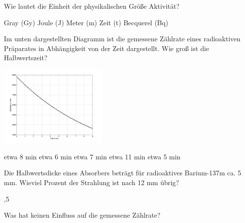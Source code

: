 \documentclass[11pt]{exam}
\begin{document}
\setlength{\voffset}{-0.5in}
\setlength{\headsep}{5pt}

\hspace{2mm}
 \hspace{5mm}
\vspace{4mm}

\begin{questions}

\question Wie lautet die Einheit der physikalischen Größe Aktivität?

\begin{choices}
	\choice Gray (Gy)
	\choice Joule (J)
	\choice Meter (m)
	\choice Zeit (t)
	\choice Becquerel (Bq)
\end{choices}

\vspace{3mm}\question Im unten dargestellten Diagramm ist die gemessene Zählrate eines radioaktiven Präparates in Abhängigkeit von der Zeit dargestellt. Wie groß ist die Halbwertszeit?

\includegraphics[width=0.4\textwidth]{images/zerfall2.png}

\begin{choices}
	\choice etwa 8 min
	\choice etwa 6 min
	\choice etwa 7 min
	\choice etwa 11 min
	\choice etwa 5 min
\end{choices}

\vspace{3mm}\question Die Halbwertsdicke eines Absorbers beträgt für radioaktives Barium-137m ca. 5 mm. Wieviel Prozent der Strahlung ist nach 12 mm übrig?

\begin{choices}
	,5 %
\end{choices}

\vspace{3mm}\question Was hat keinen Einfluss auf die gemessene Zählrate?


\end{questions}
\end{document}
